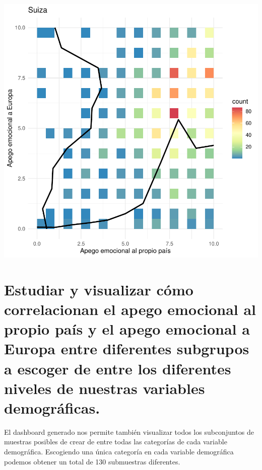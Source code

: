 \documentclass{article}
\begin{document}
\includegraphics{Informe-024}

\newpage
\section{Estudiar y visualizar cómo correlacionan el apego emocional al propio país y el apego emocional a Europa entre diferentes subgrupos a escoger de entre los diferentes niveles de nuestras variables demográficas.}

\noindent El dashboard generado nos permite también visualizar todos los subconjuntos de muestras posibles de crear de entre todas las categorías de cada variable demográfica. Escogiendo una única categoría en cada variable demográfica podemos obtener un total de 130 submuestras diferentes.
\end{document}

